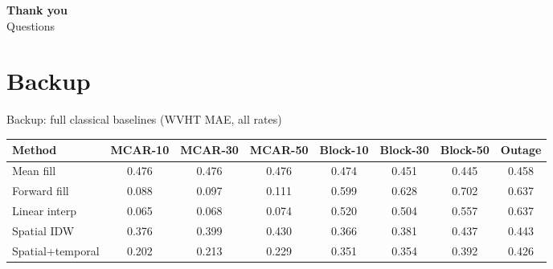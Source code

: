 \documentclass[aspectratio=169]{beamer}
\begin{document}
\begin{frame}[plain]
  \vfill\begin{center}
  {\color{colgraph}\Large\bfseries Thank you}\\[1ex]
  {\large Questions}
  \end{center}\vfill
\end{frame}

\appendix
\section{Backup}

\begin{frame}{Backup: full classical baselines (WVHT MAE, all rates)}
  \begin{center}\scriptsize
  \begin{tabular}{l ccc ccc c}
    \toprule
    Method & MCAR-10 & MCAR-30 & MCAR-50 & Block-10 & Block-30 & Block-50 & Outage\\
    \midrule
\textcolor{coltemporal}{Mean fill} & 0.476 & 0.476 & 0.476 & 0.474 & 0.451 & 0.445 & 0.458 \\
\textcolor{coltemporal}{Forward fill} & 0.088 & 0.097 & 0.111 & 0.599 & 0.628 & 0.702 & 0.637 \\
\textcolor{coltemporal}{Linear interp} & 0.065 & 0.068 & 0.074 & 0.520 & 0.504 & 0.557 & 0.637 \\
\textcolor{colspatial}{Spatial IDW} & 0.376 & 0.399 & 0.430 & 0.366 & 0.381 & 0.437 & 0.443 \\
\textcolor{colspatial}{Spatial+temporal} & 0.202 & 0.213 & 0.229 & 0.351 & 0.354 & 0.392 & 0.426 \\
    \bottomrule
  \end{tabular}
  \end{center}
\end{frame}
\end{document}
